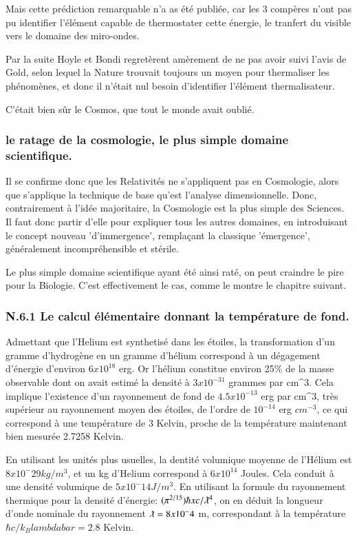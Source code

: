 \documentclass[a4paper,12pt]{article}
\begin{document}
Mais cette prédiction remarquable n'a as été publiée, car les 3 compères n'ont pas pu identifier l'élément capable de thermostater cette énergie, le tranfert du  visible vers le domaine des miro-ondes. 

Par la suite Hoyle et Bondi regretèrent amèrement de ne pas avoir suivi l'avis de Gold, selon lequel la Nature trouvait toujours un moyen pour thermaliser les phénomènes, et donc il n'était nul besoin d'identifier l'élément thermalisateur.

C'était bien sûr le Cosmos, que tout le monde avait oublié. 
    

\subsubsection{le ratage de la cosmologie, le plus simple domaine scientifique.}


 Il se confirme donc que les Relativités ne s'appliquent pas en Cosmologie, alors que s'applique la technique de base qu'est l'analyse dimensionnelle. Donc, contrairement à l'idée majoritaire, la Cosmologie est la plus simple des Sciences. Il faut donc partir d'elle pour expliquer tous les autres domaines, en introduisant le concept nouveau 'd'immergence', remplaçant la classique 'émergence', généralement incompréhensible et stérile. 


Le plus simple domaine scientifique ayant été ainsi raté, on peut craindre le pire pour la Biologie. C’est effectivement le cas, comme le montre le chapitre suivant.


\subsubsection{N.6.1 Le calcul élémentaire donnant la température de fond.}

Admettant que l'Helium est synthetisé dans les étoiles, la transformation d'un gramme d'hydrogène en un gramme d'hélium correspond à un dégagement d'énergie d'environ $6 x 10^{18}$ erg. Or l'hélium  constitue environ 25\% de la masse observable dont on avait estimé la densité à $3 x 10^{-31}$ grammes par cm^3. Cela implique l'existence d'un rayonnement de fond de $4.5 x 10^{-13}$ erg par cm^3,  très supérieur au rayonnement moyen des étoiles, de l'ordre de $10^{-14}$ erg $cm^{-3}$, ce qui correspond à une température de 3 Kelvin, proche de la température maintenant bien mesurée  2.7258   Kelvin.

En utilisant les unités plus usuelles, la dentité volumique moyenne de l'Hélium est $8 x 10^-29 kg/m^3$, et un kg d'Helium correspond à $6 x 10^{14}$ Joules. Cela conduit à une densité volumique de $5x 10^-14 J/m^3$. En utilisant la formule du rayonnement thermique pour la densité d'énergie: $(\pi^{2/15}) \hbar x c/\lambdabar^4$, on en déduit la longueur d'onde nominale du rayonnement $\lambdabar = 8x 10^-4$ m, correspondant à la température $\hbar c/k_ B lambdabar = 2.8$ Kelvin.
\end{document}
